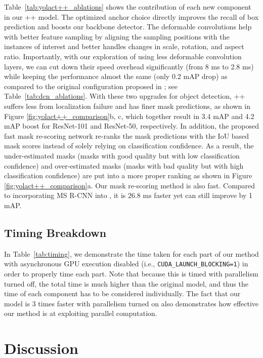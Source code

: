 \documentclass[10pt,journal,compsoc]{IEEEtran}
\begin{document}
     Table~\ref{tab:yolact++_ablations} shows the contribution of each new component in our \methodname{}++ model. The optimized anchor choice directly improves the recall of box prediction and boosts our backbone detector. The deformable convolutions help with better feature sampling by aligning the sampling positions with the instances of interest and better handles changes in scale, rotation, and aspect ratio. Importantly, with our exploration of using less deformable convolution layers, we can cut down their speed overhead significantly (from 8 ms to 2.8 ms) while keeping the performance almost the same (only 0.2 mAP drop) as compared to the original configuration proposed in \cite{deformv2}; see Table~\ref{tab:dcn_ablations}. With these two upgrades for object detection, \methodname{}++  suffers less from localization failure and has finer mask predictions, as shown in Figure \ref{fig:yolact++_comparison}b, c, which together result in 3.4 mAP and 4.2 mAP boost for ResNet-101 and ResNet-50, respectively. In addition, the proposed fast mask re-scoring network re-ranks the mask predictions with the IoU based mask scores instead of solely relying on classification confidence. As a result, the under-estimated masks (masks with good quality but with low classification confidence) and over-estimated masks (masks with bad quality but with high classification confidence) are put into a more proper ranking as shown in Figure \ref{fig:yolact++_comparison}a. Our mask re-scoring method is also fast. Compared to incorporating MS R-CNN into \methodname{}, it is 26.8 ms faster yet can still improve \methodname{} by 1 mAP.
     



     
\subsection{Timing Breakdown} In Table~\ref{tab:timing}, we demonstrate the time taken for each part of our method with asynchronous GPU execution disabled (i.e., \texttt{CUDA\_LAUNCH\_BLOCKING=1}) in order to properly time each part. Note that because this is timed with parallelism turned off, the total time is much higher than the original model, and thus the time of each component has to be considered individually. The fact that our model is 3 times faster with parallelism turned on also demonstrates how effective our method is at exploiting parallel computation.


    
\section{Discussion}
\end{document}
